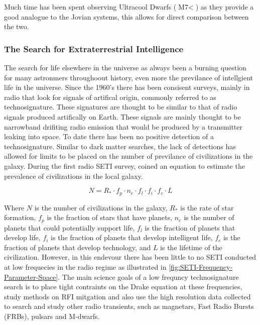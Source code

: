 Much time has been spent observing Ultracool Dwarfs ($\text{M7} <$) as they provide a good analogue to the Jovian systems, this allows for direct comparison between the two. 


\subsubsection{The Search for Extraterrestrial Intelligence}

The search for life elsewhere in the universe as always been a burning question for many astronmers throughoout history, even more the previlance of intellgient life in the universe. Since the 1960's there has been consisent surveys, mainly in radio that look for signals of artifical origin, commonly referred to as technosignature. These signatures are thought to be similar to that of radio signals produced artifically on Earth. These signals are mainly thought to be narrowband drifiting radio emission that would be produced by a transmitter leaking into space. To date there has been no positive detection of a technosignature. Similar to dark matter searches, the lack of detections has allowed for limits to be placed on the number of previlance of civilizations in the galaxy. During the first radio SETI survey, \cite{Drake61Ozman} coined an equation to estimate the prevalence of civilizations in the local galaxy. 

\begin{equation}
    N = R_* \cdot f_p \cdot n_e \cdot f_l \cdot f_i \cdot f_c \cdot L
    \label{DrakeEquation}
\end{equation}

Where $N$ is the number of civilizations in the galaxy, $R_*$ is the rate of star formation, $f_p$ is the fraction of stars that have planets, $n_e$ is the number of planets that could potentially support life, $f_l$ is the fraction of planets that develop life, $f_i$ is the fraction of planets that develop intelligent life, $f_c$ is the fraction of planets that develop technology, and $L$ is the lifetime of the civilization. However, in this endevour there has been little to no SETI conducted at low frequecies in the radio regime as illustrated in \cref{fig:SETI-Frequency-Parameter-Space}. The main science goals of a low frequncy technosignature search is to place tight contraints on the Drake equation at these frequencies, study methods on RFI mitgation and also use the high resolution data collected to search and study other radio transients, such as magnetars, Fast Radio Bursts (FRBs), pulsars and M-dwarfs.

